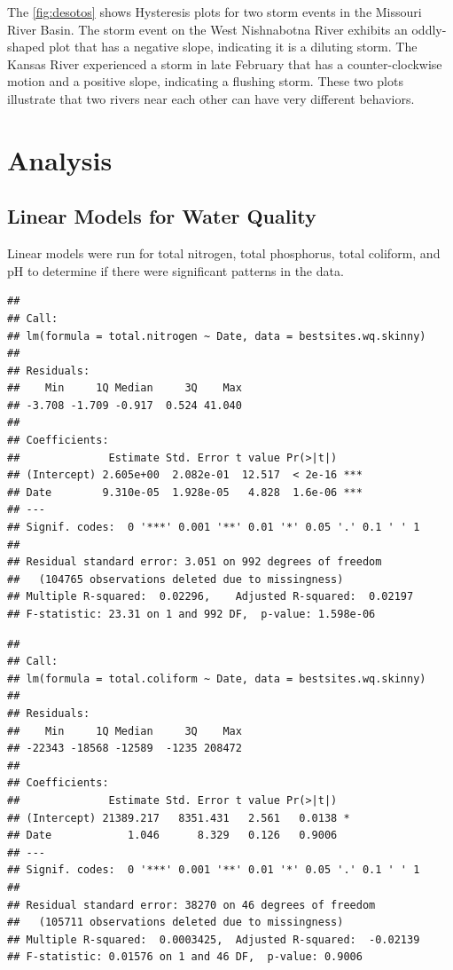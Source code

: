\documentclass[12pt,]{article}
\begin{document}
The \autoref{fig:desotos} shows Hysteresis plots for two storm events in
the Missouri River Basin. The storm event on the West Nishnabotna River
exhibits an oddly-shaped plot that has a negative slope, indicating it
is a diluting storm. The Kansas River experienced a storm in late
February that has a counter-clockwise motion and a positive slope,
indicating a flushing storm. These two plots illustrate that two rivers
near each other can have very different behaviors.

\newpage

\hypertarget{analysis}{%
\section{Analysis}\label{analysis}}

\hypertarget{linear-models-for-water-quality}{%
\subsection{Linear Models for Water
Quality}\label{linear-models-for-water-quality}}

Linear models were run for total nitrogen, total phosphorus, total
coliform, and pH to determine if there were significant patterns in the
data.

\begin{verbatim}
## 
## Call:
## lm(formula = total.nitrogen ~ Date, data = bestsites.wq.skinny)
## 
## Residuals:
##    Min     1Q Median     3Q    Max 
## -3.708 -1.709 -0.917  0.524 41.040 
## 
## Coefficients:
##              Estimate Std. Error t value Pr(>|t|)    
## (Intercept) 2.605e+00  2.082e-01  12.517  < 2e-16 ***
## Date        9.310e-05  1.928e-05   4.828  1.6e-06 ***
## ---
## Signif. codes:  0 '***' 0.001 '**' 0.01 '*' 0.05 '.' 0.1 ' ' 1
## 
## Residual standard error: 3.051 on 992 degrees of freedom
##   (104765 observations deleted due to missingness)
## Multiple R-squared:  0.02296,    Adjusted R-squared:  0.02197 
## F-statistic: 23.31 on 1 and 992 DF,  p-value: 1.598e-06
\end{verbatim}

\begin{verbatim}
## 
## Call:
## lm(formula = total.coliform ~ Date, data = bestsites.wq.skinny)
## 
## Residuals:
##    Min     1Q Median     3Q    Max 
## -22343 -18568 -12589  -1235 208472 
## 
## Coefficients:
##              Estimate Std. Error t value Pr(>|t|)  
## (Intercept) 21389.217   8351.431   2.561   0.0138 *
## Date            1.046      8.329   0.126   0.9006  
## ---
## Signif. codes:  0 '***' 0.001 '**' 0.01 '*' 0.05 '.' 0.1 ' ' 1
## 
## Residual standard error: 38270 on 46 degrees of freedom
##   (105711 observations deleted due to missingness)
## Multiple R-squared:  0.0003425,  Adjusted R-squared:  -0.02139 
## F-statistic: 0.01576 on 1 and 46 DF,  p-value: 0.9006
\end{verbatim}
\end{document}
